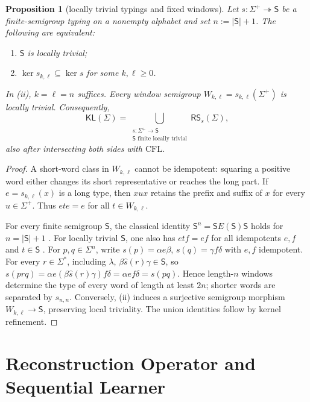 \documentclass[11pt,a4paper]{article}
\newtheorem{proposition}[theorem]{Proposition}
\theoremstyle{remark}
\theoremstyle{plain}
\begin{document}
\begin{proposition}[locally trivial typings and fixed windows]
\label{prop:li-window}
Let $s:\Sigma^+\twoheadrightarrow\mathsf S$ be a
finite-semigroup typing on a nonempty alphabet and set
$n:=|\mathsf S|+1$. The following are equivalent:
\begin{enumerate}[label=\textup{(\roman*)},nosep]
\item $\mathsf S$ is locally trivial;
\item $\ker s_{k,\ell}\subseteq\ker s$ for some $k,\ell\ge0$.
\end{enumerate}
In (ii), $k=\ell=n$ suffices. Every window semigroup
$W_{k,\ell}=s_{k,\ell}(\Sigma^+)$ is locally trivial.
Consequently,
\[
\mathsf{KL}(\Sigma)=
\bigcup_{\substack{s:\Sigma^+\to\mathsf S\\
\mathsf S\text{ finite locally trivial}}}
\mathsf{RS}_s(\Sigma),
\]
also after intersecting both sides with $\mathrm{CFL}$.
\end{proposition}
\begin{proof}
A short-word class in $W_{k,\ell}$ cannot be idempotent:
squaring a positive word either changes its short
representative or reaches the long part. If $e=s_{k,\ell}(x)$
is a long type, then $xux$ retains the prefix and
suffix of $x$ for every $u\in\Sigma^+$.
Thus $ete=e$ for all $t\in W_{k,\ell}$.

For every finite semigroup $\mathsf S$, the classical identity
$\mathsf S^n=\mathsf S E(\mathsf S)\mathsf S$
holds for $n=|\mathsf S|+1$
\cite[Chapter~1, Proposition~1.12]{pin1986}.
For locally trivial $\mathsf S$, one also has
$etf=ef$ for all idempotents $e,f$ and $t\in\mathsf S$
\cite[Chapter~2, Proposition~3.5]{pin1986}.
For $p,q\in\Sigma^n$, write
$s(p)=\alpha e\beta$, $s(q)=\gamma f\delta$ with $e,f$ idempotent.
For every $r\in\Sigma^*$, including $\lambda$,
$\beta\widehat s(r)\gamma\in\mathsf S$, so
$s(prq)=\alpha e(\beta\widehat s(r)\gamma)f\delta
=\alpha ef\delta=s(pq)$.
Hence length-$n$ windows determine the type
of every word of length at least $2n$; shorter
words are separated by $s_{n,n}$. Conversely,
(ii) induces a surjective semigroup morphism
$W_{k,\ell}\to\mathsf S$, preserving local triviality.
The union identities follow by kernel refinement.
\end{proof}
\section{Reconstruction Operator and Sequential Learner}
\label{sec:algo}
\end{document}

